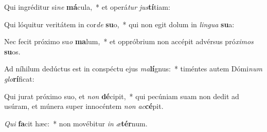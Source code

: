 \item Qui ingréditur si\textit{ne} \textbf{má}cula,~* et operá\textit{tur} \textit{jus}\textbf{tí}tiam:
\item Qui lóquitur veritátem in cor\textit{de} \textbf{su}o,~* qui non egit dolum in \textit{lin}\textit{gua} \textbf{su}a:
\item Nec fecit próximo su\textit{o} \textbf{ma}lum,~* et oppróbrium non accépit advérsus pró\textit{xi}\textit{mos} \textbf{su}os.
\item Ad níhilum dedúctus est in conspéctu ejus \textit{ma}\textbf{lí}gnus:~* timéntes autem Dómi\textit{num} \textit{glo}\textbf{rí}ficat:
\item Qui jurat próximo suo, et \textit{non} \textbf{dé}cipit,~* qui pecúniam suam non dedit ad usúram, et múnera super innocéntem \textit{non} \textit{ac}\textbf{cé}pit.
\item \textit{Qui} \textbf{fa}cit hæc:~* non movébitur \textit{in} \textit{æ}\textbf{tér}num.
